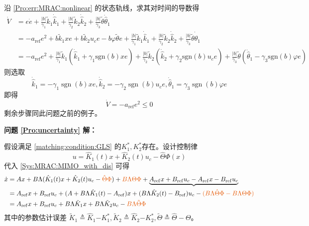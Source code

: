 沿 \eqref{Pro:err:MRAC:nonlinear} 的状态轨线，求其对时间的导数得
\begin{equation*}
    \begin{aligned}\dot{V}&= e\dot{e}+\frac{|b|}{\gamma_{1}}\tilde{k}_{1}\dot{\hat{k}}_{1}+\frac{|b|}{\gamma_{2}}\tilde{k}_{2}\dot{\hat{k}}_{2}+\frac{|b|}{\gamma_{3}}\tilde{\theta}\dot{\hat{\theta}}_{1}\\
    &=-a_{\mathrm{ref}}e^{2}+b\tilde{k}_{1}xe+b\tilde{k}_{2}u_{c}e-b\varphi\tilde{\theta}e+\frac{|b|}{\gamma_{1}}\tilde{k}_{1}\dot{\hat{k}}_{1}+\frac{|b|}{\gamma_{2}}\tilde{k}_{2}\dot{\hat{k}}_{2}+\frac{|b|}{\gamma_{3}}\tilde{\theta}\dot{\hat{\theta}}_{1}\\
    &=-a_{\mathrm{ref}}e^{2}+\frac{|b|}{\gamma_{1}}\tilde{k}_{1}\left(\dot{\hat{k}}_{1}+\gamma_{1}\mathrm{sgn}(b)xe\right)+\frac{|b|}{\gamma_{2}}\tilde{k}_{2}\left(\dot{\hat{k}}_{2}+\gamma_{2}\mathrm{sgn}(b)u_{c}e\right)+\frac{|b|}{\gamma_{3}}\tilde{\theta}\left(\dot{\hat{\theta}}_{1}-\gamma_{3}\mathrm{sgn}(b)\varphi e\right)\end{aligned}
\end{equation*}
则选取
\begin{equation*}
  \dot{\hat{k}}_1 = -  \gamma_1 \ensuremath{\operatorname{sgn}} (b) x  e,
  \dot{\hat{k}}_2 = -  \gamma_2 \ensuremath{\operatorname{sgn}} (b)  u_c e,
  \dot{\hat{\theta}}_1 = \gamma_3 \ensuremath{\operatorname{sgn}} (b)   \varphi e
\end{equation*}
即得
\begin{equation*}
  \dot{V} = - a_{\ensuremath{\operatorname{ref}}} e^2 \leq 0
\end{equation*}
剩余步骤同此问题之前的例子。

\noindent\textcolor{winered}{\textbf{问题 \ref{Pro:uncertainty} 解：}}

假设满足 \eqref{matching:condition:GLS} 的$K^{\ast}_1, K^{\ast}_2$存在。设计控制律\[ u = \hat{K}_1 (t) x + \hat{K}_2 (t) u_c - \hat{\Theta}\Phi (x)  \]
代入 \eqref{Sys:MRAC:MIMO_with_dis} 可得
\begin{align}
    \dot{x}&=A  x + B \Lambda (\hat{K}_1 (t) x + \hat{K}_2 (t) u_c-\textcolor{second}{\hat{\Theta}\Phi})+\textcolor{second}{B\Lambda\Theta\Phi}+
    \underbrace{A_{\ensuremath{\operatorname{ref}}} x +
    B_{\ensuremath{\operatorname{ref}}} u_c-A_{\ensuremath{\operatorname{ref}}} x -
    B_{\ensuremath{\operatorname{ref}}} u_c}\nonumber\\
    &=A_{\ensuremath{\operatorname{ref}}} x +
    B_{\ensuremath{\operatorname{ref}}} u_c+(A + B \Lambda \hat{K}_1 (t)-A_{\ensuremath{\operatorname{ref}}}) x+(B\Lambda\hat{K}_2 (t)-B_{\ensuremath{\operatorname{ref}}}) u_c-\textcolor{second}{(B\Lambda\hat{\Theta}\Phi-B\Lambda\Theta\Phi)}\nonumber\\
    &=A_{\ensuremath{\operatorname{ref}}}  x +
   B_{\ensuremath{\operatorname{ref}}} u_c + B \Lambda  \tilde{K}_1 x + B
   \Lambda  \tilde{K}_2 u_c -\textcolor{second}{B\Lambda\tilde{\Theta}\Phi}\label{mimo_with_dis_dotx}
\end{align}
其中的参数估计误差 $\tilde{K}_1 \triangleq \hat{K}_1 {- K_1^{\ast}} , \tilde{K}_2 \triangleq \hat{K}_2 {- K_2^{\ast}} ,\tilde{\Theta}\triangleq\hat{\Theta}-\Theta$。

